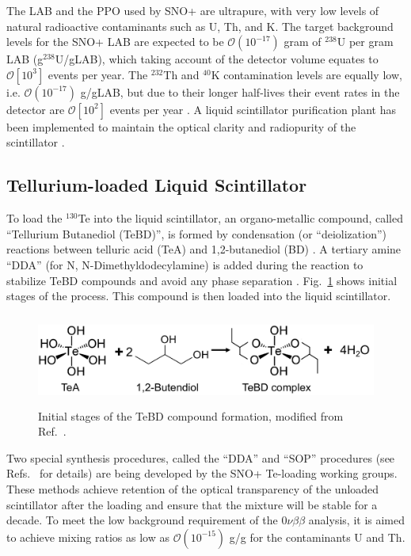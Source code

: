 The LAB and the PPO used by SNO+ are ultrapure, with very low levels of natural radioactive contaminants such as U, Th, and K. The target background levels for the SNO+ LAB are expected to be $\mathcal O(10^{-17})$ gram of $^{238}$U per gram LAB (g$^{238}$U/gLAB), which taking account of the detector volume equates to $\mathcal{O}\left[10^3\right]$ events per year. The $^{232}$Th and $^{40}$K contamination levels are equally low, i.e. $\mathcal O(10^{-17})$ g/gLAB, but due to their longer half-lives their event rates in the detector are $\mathcal{O}\left[10^2\right]$ events per year \cite{snop_jinst,markchen_bkg}. A liquid scintillator purification plant has been implemented to maintain the optical clarity and radiopurity of the scintillator \cite{snop_jinst}.

\subsection{Tellurium-loaded Liquid Scintillator}\label{sect:TeLS_SNO+}

To load the $^{130}$Te into the liquid scintillator, an organo-metallic compound, called ``Tellurium Butanediol (TeBD)'', is formed by condensation (or ``deiolization'') reactions between telluric acid (TeA) and 1,2-butanediol (BD) \cite{Paton:2019kgy}. A tertiary amine ``DDA'' (for N, N-Dimethyldodecylamine) is added during the reaction to stabilize TeBD compounds and avoid any phase separation \cite{teLoadingPaper}. Fig.~\ref{fig:paton_te} shows initial stages of the process. This compound is then loaded into the liquid scintillator.
\begin{figure}[!htb]
	\centering
	\includegraphics[height = 3cm]{TeBD_process.png}
	\caption[Initial stages of the TeBD compound formation.]{Initial stages of the TeBD compound formation, modified from Ref.~\cite{Paton:2019kgy}.}
	\label{fig:paton_te}
\end{figure}

Two special synthesis procedures, called the ``DDA'' and ``SOP'' procedures (see Refs.~\cite{biller2017new,teDDA,DDAvsSOP} for details) are being developed by the SNO+ Te-loading working groups. These methods achieve retention of the optical transparency of the unloaded scintillator after the loading and ensure that the mixture will be stable for a decade. To meet the low background requirement of the $0\nu\beta\beta$ analysis, it is aimed to achieve mixing ratios as low as $\mathcal{O}(10^{-15})$ g/g for the contaminants U and Th.

